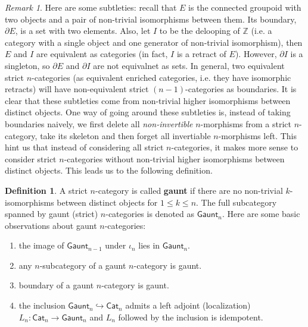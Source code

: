 \documentclass{article}
\theoremstyle{definition}
\newtheorem{mydef}{Definition}[section]
\theoremstyle{remark}
\newtheorem*{remark}{Remark}
\begin{document}
\begin{remark}
Here are some subtleties: recall that $E$ is the connected groupoid with two objects and a pair of non-trivial isomorphisms between them. Its boundary, $\partial E$, is a set with two elements. Also, let $I$ to be the delooping of $\mathbb{Z}$ (i.e. a category with a single object and one generator of non-trivial isomorphism), then $E$ and $I$ are equivalent as categories (in fact, $I$ is a retract of $E$). However, $\partial I$ is a singleton, so $\partial E$ and $\partial I$ are not equivalnet as sets. In general, two equivalent strict $n$-categories (as equivalent enriched categories, i.e. they have isomorphic retracts) will have non-equivalent strict $(n-1)$-categories as boundaries. It is clear that these subtleties come from non-trivial higher isomorphisms between distinct objects. One way of going around these subtleties is, instead of taking boundaries naively, we first delete all \textit{non-invertible} $n$-morphisms from a strict $n$-category, take its skeleton and then forget all invertiable $n$-morphisms left. This hint us that instead of considering all strict $n$-categories, it makes more sense to consider strict $n$-categories without non-trivial higher isomorphisms between distinct objects. This leads us to the following definition.
\end{remark}

\begin{mydef}
A strict $n$-category is called \textbf{gaunt} if there are no non-trivial $k$-isomorphisms between distinct objects for $1 \leq k \leq n$. The full subcategory spanned by gaunt (strict) $n$-categories is denoted as $\mathsf{Gaunt}_n$. Here are some basic observations about gaunt $n$-categories:
\begin{enumerate}
    \item the image of $\mathsf{Gaunt}_{n-1}$ under $\iota_n$ lies in $\mathsf{Gaunt}_n$.
    \item any $n$-subcategory of a gaunt $n$-category is gaunt.
    \item boundary of a gaunt $n$-category is gaunt.
    \item the inclusion $\mathsf{Gaunt}_n \hookrightarrow \mathsf{Cat}_n$ admits a left adjoint (localization) $L_n:\mathsf{Cat}_n \to \mathsf{Gaunt}_n$ and $L_n$ followed by the inclusion is idempotent.
\end{enumerate}

\end{mydef}
\end{document}
